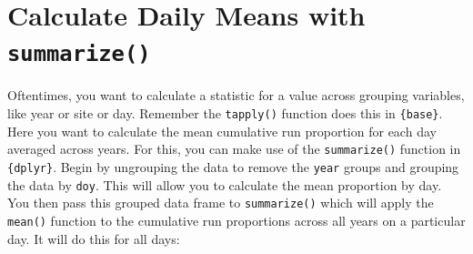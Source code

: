 \documentclass[]{book}
\newenvironment{Shaded}{\begin{snugshade}}{\end{snugshade}}
\newcommand{\CommentTok}[1]{\textcolor[rgb]{0.56,0.35,0.01}{\textit{#1}}}
\newcommand{\ControlFlowTok}[1]{\textcolor[rgb]{0.13,0.29,0.53}{\textbf{#1}}}
\newcommand{\DataTypeTok}[1]{\textcolor[rgb]{0.13,0.29,0.53}{#1}}
\newcommand{\DecValTok}[1]{\textcolor[rgb]{0.00,0.00,0.81}{#1}}
\newcommand{\KeywordTok}[1]{\textcolor[rgb]{0.13,0.29,0.53}{\textbf{#1}}}
\newcommand{\NormalTok}[1]{#1}
\newcommand{\OperatorTok}[1]{\textcolor[rgb]{0.81,0.36,0.00}{\textbf{#1}}}
\newcommand{\StringTok}[1]{\textcolor[rgb]{0.31,0.60,0.02}{#1}}
\begin{document}
\begin{Shaded}
\end{Shaded}

\hypertarget{calculate-daily-means-with-summarize}{%
\section{\texorpdfstring{Calculate Daily Means with \texttt{summarize()}}{Calculate Daily Means with summarize()}}\label{calculate-daily-means-with-summarize}}

Oftentimes, you want to calculate a statistic for a value across grouping variables, like year or site or day. Remember the \texttt{tapply()} function does this in \texttt{\{base\}}. Here you want to calculate the mean cumulative run proportion for each day averaged across years. For this, you can make use of the \texttt{summarize()} function in \texttt{\{dplyr\}}. Begin by ungrouping the data to remove the \texttt{year} groups and grouping the data by \texttt{doy}. This will allow you to calculate the mean proportion by day. You then pass this grouped data frame to \texttt{summarize()} which will apply the \texttt{mean()} function to the cumulative run proportions across all years on a particular day. It will do this for all days:
\end{document}
